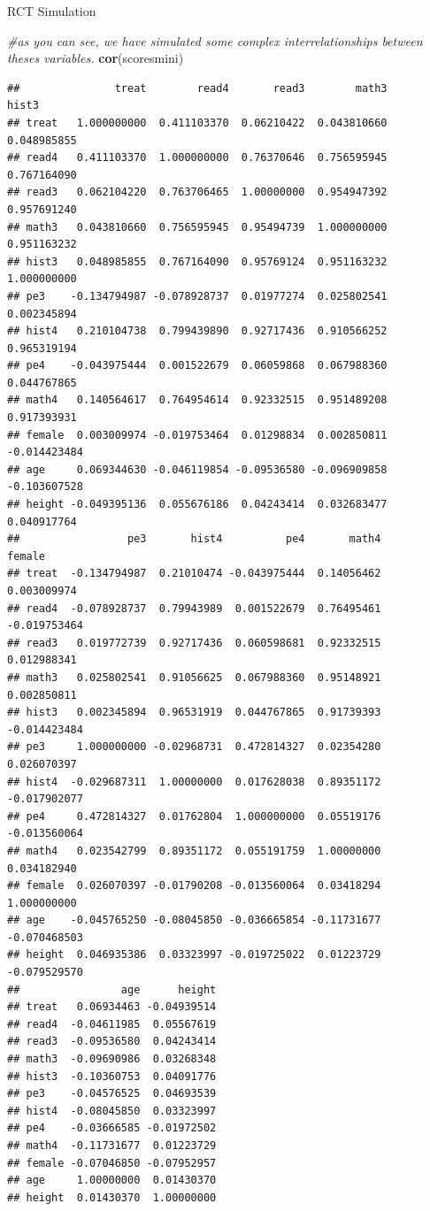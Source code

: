 \documentclass[
  ignorenonframetext,
]{beamer}
\newenvironment{Shaded}{\begin{snugshade}}{\end{snugshade}}
\newcommand{\CommentTok}[1]{\textcolor[rgb]{0.56,0.35,0.01}{\textit{#1}}}
\newcommand{\KeywordTok}[1]{\textcolor[rgb]{0.13,0.29,0.53}{\textbf{#1}}}
\newcommand{\NormalTok}[1]{#1}
\begin{document}
\begin{frame}[fragile]{RCT Simulation}
\protect\hypertarget{rct-simulation-5}{}
\tiny

\begin{Shaded}
\begin{Highlighting}[]
\CommentTok{\#as you can see, we have simulated some complex interrelationships between theses variables.}
\KeywordTok{cor}\NormalTok{(scoresmini)}
\end{Highlighting}
\end{Shaded}

\begin{verbatim}
##               treat        read4       read3        math3        hist3
## treat   1.000000000  0.411103370  0.06210422  0.043810660  0.048985855
## read4   0.411103370  1.000000000  0.76370646  0.756595945  0.767164090
## read3   0.062104220  0.763706465  1.00000000  0.954947392  0.957691240
## math3   0.043810660  0.756595945  0.95494739  1.000000000  0.951163232
## hist3   0.048985855  0.767164090  0.95769124  0.951163232  1.000000000
## pe3    -0.134794987 -0.078928737  0.01977274  0.025802541  0.002345894
## hist4   0.210104738  0.799439890  0.92717436  0.910566252  0.965319194
## pe4    -0.043975444  0.001522679  0.06059868  0.067988360  0.044767865
## math4   0.140564617  0.764954614  0.92332515  0.951489208  0.917393931
## female  0.003009974 -0.019753464  0.01298834  0.002850811 -0.014423484
## age     0.069344630 -0.046119854 -0.09536580 -0.096909858 -0.103607528
## height -0.049395136  0.055676186  0.04243414  0.032683477  0.040917764
##                 pe3       hist4          pe4       math4       female
## treat  -0.134794987  0.21010474 -0.043975444  0.14056462  0.003009974
## read4  -0.078928737  0.79943989  0.001522679  0.76495461 -0.019753464
## read3   0.019772739  0.92717436  0.060598681  0.92332515  0.012988341
## math3   0.025802541  0.91056625  0.067988360  0.95148921  0.002850811
## hist3   0.002345894  0.96531919  0.044767865  0.91739393 -0.014423484
## pe3     1.000000000 -0.02968731  0.472814327  0.02354280  0.026070397
## hist4  -0.029687311  1.00000000  0.017628038  0.89351172 -0.017902077
## pe4     0.472814327  0.01762804  1.000000000  0.05519176 -0.013560064
## math4   0.023542799  0.89351172  0.055191759  1.00000000  0.034182940
## female  0.026070397 -0.01790208 -0.013560064  0.03418294  1.000000000
## age    -0.045765250 -0.08045850 -0.036665854 -0.11731677 -0.070468503
## height  0.046935386  0.03323997 -0.019725022  0.01223729 -0.079529570
##                age      height
## treat   0.06934463 -0.04939514
## read4  -0.04611985  0.05567619
## read3  -0.09536580  0.04243414
## math3  -0.09690986  0.03268348
## hist3  -0.10360753  0.04091776
## pe3    -0.04576525  0.04693539
## hist4  -0.08045850  0.03323997
## pe4    -0.03666585 -0.01972502
## math4  -0.11731677  0.01223729
## female -0.07046850 -0.07952957
## age     1.00000000  0.01430370
## height  0.01430370  1.00000000
\end{verbatim}
\end{frame}
\end{document}
